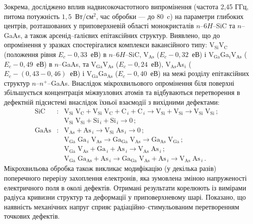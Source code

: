 Зокрема, досліджено вплив надвисокочастотного випромінення (частота 2,45 ГГц, питома потужність  $1,5$~Вт/см$^2$, час обробки --- до 80~c) на параметри глибоких центрів, розташованих у приповерхневій області монокристалів $n$--6$H$--SiC та $n$--GaAs, а також арсенід--ґалієвих епітаксійних структур.
Виявлено, що до опромінення у зразках спостерігалися комплекси вакансійного типу:
%
V$_\text{Si}$V$_\text{C}$ (положення рівня $E_c-0,33$~еВ) в $n$--6$H$--SiC,
V$_\text{As}$ ($E_c-0,32$~еВ) і V$_\text{Ga}$Ga$_i$V$_\text{As}$ ($E_c-0,49$~еВ) в $n$--GaAs,
та V$_\text{Ga}$V$_\text{As}$ ($E_c-0,24$~еВ), V$_\text{As}$As$_i$ ($E_c-(0,43-0,46)$~еВ) і
 V$_\text{Ga}$Ga$_\text{As}$ ($E_c-0,40$~еВ) на межі розділу епітаксійних структур $n$--$n^+$--GaAs.
Внаслідок мікрохвильового опромінення біля поверхні збільшується концентрація міжвузлових атомів та відбуваються перетворення в дефектній
підсистемі внаслідок їхньої взаємодії з вихідними дефектами:
\begin{eqnarray*}
  \text{SiC}&:&\text{V}_\text{Si}\;\text{V}_\text{C}+\text{V}_\text{Si}\;\text{V}_\text{C}+\text{C}_{\,i}+ \text{C}_{\,i} \rightarrow \text{V}_\text{Si}+ \text{V}_\text{Si}\rightarrow \text{V}_\text{Si}\;\text{V}_\text{Si}\,;\\
  &&\text{V}_\text{Si}\;\text{V}_\text{Si}+\text{Si}_{\,i}+ \text{Si}_{\,i} \rightarrow 0\,;\\
  \text{GaAs}&:&\text{V}_\text{As}+ \text{As}_{\,i} \rightarrow\text{V}_\text{Si}\;\text{As}_{\,i} \rightarrow 0\,;\\
   &&  \text{V}_\text{Ga}\;\text{Ga}_{\,i}\;\text{V}_\text{As}\rightarrow \text{Ga}_\text{Ga}\;\text{V}_\text{As}
  \rightarrow \text{Ga}_\text{As}\;\text{V}_\text{Ga} \,;\\
  &&\text{V}_\text{Ga}\;\text{V}_\text{As}+\text{Ga}_{\,i}+\text{As}_{\,i} \rightarrow \text{V}_\text{As}\;\text{As}_{\,i}\,;\\
  &&  \text{V}_\text{Ga}\;\text{Ga}_\text{As}+\text{As}_{\,i} \rightarrow
  \text{Ga}_\text{Ga}\;\text{V}_\text{As}+\text{As}_{\,i} \rightarrow
  \text{V}_\text{As}\;\text{As}_{\,i}\,.
\end{eqnarray*}
Мікрохвильова обробка також викликає модифікацію (у декілька разів) поперечного перерізу захоплення електронів,
яка зумовлена зміною напруженості електричного поля в околі дефектів.
Отримані результати
корелюють із вимірами радіуса кривизни структур та деформації у приповерхневому шарі.
Показано, що наявність механічних напруг сприяє радіаційно--стимульованим перетворенням точкових дефектів.

